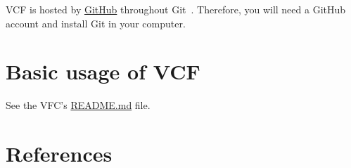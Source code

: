 VCF is hosted by \href{https://github.com}{GitHub} throughout
Git~\cite{vruiz__GitHub}. Therefore, you will need a GitHub account
and install Git in your computer.

\section{Basic usage of VCF}

See the VFC's \href{https://github.com/Sistemas-Multimedia/VCF/blob/main/README.md}{README.md} file.

\section{References}

\renewcommand{\addcontentsline}[3]{}%

